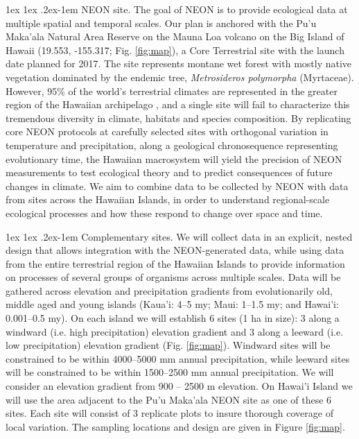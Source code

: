 \documentclass[11pt]{article}
\makeatletter
\renewcommand{\paragraph}{\@startsection{paragraph}{4}{\z@}
  {1ex \@plus 1ex \@minus .2ex}{-1em}
  {\normalfont\normalsize\it}
}
\makeatother
\begin{document}
\paragraph{NEON site.}
The goal of NEON is to provide ecological data at multiple spatial and
temporal scales. Our plan is anchored with the Pu'u Maka'ala Natural
Area Reserve on the Mauna Loa volcano on the Big Island of Hawaii
(19.553\textdegree, -155.317\textdegree; Fig. \ref{fig:map}), a Core
Terrestrial site with the launch date planned for 2017. The site
represents montane wet forest with mostly native vegetation dominated
by the endemic tree, {\it Metrosideros polymorpha}
(Myrtaceae). However, 95\% of the world’s terrestrial climates
are represented in the greater region of the Hawaiian archipelago
\citep{juvik1998}, and a single site will fail to characterize this
tremendous diversity in climate, habitats and species composition. By
replicating core NEON protocols at carefully selected sites with
orthogonal variation in temperature and precipitation, along a
geological chronosequence representing evolutionary time, the Hawaiian
macrosystem will yield the precision of NEON measurements to test
ecological theory and to predict consequences of future changes in
climate. We aim to combine data to be collected by NEON with data from sites
across the Hawaiian Islands, in order to understand regional-scale
ecological processes and how these respond to change over space and
time.


\paragraph{Complementary sites.}
We will collect data in an explicit, nested design that allows
integration with the NEON-generated data, while using data from the
entire terrestrial region of the Hawaiian Islands to provide
information on processes of several groups of organisms across
multiple scales. Data will be gathered across elevation and
precipitation gradients from evolutionarily old, middle aged and young
islands (Kaua'i: 4--5 my; Maui: 1--1.5 my; and Hawai'i: 0.001--0.5
my).  On each island we will establish 6 sites (1 ha in size): 3 along
a windward (i.e. high precipitation) elevation gradient and 3 along a
leeward (i.e. low precipitation) elevation gradient
(Fig. \ref{fig:map}).  Windward sites will be constrained to be within
4000--5000 mm annual precipitation, while leeward sites will be
constrained to be within 1500--2500 mm annual precipitation.  We will
consider an elevation gradient from 900 -- 2500 m elevation.  On
Hawai'i Island we will use the area adjacent to the Pu'u Maka'ala NEON
site as one of these 6 sites.  Each site will consist of 3 replicate
plots to insure thorough coverage of local variation. The sampling
locations and design are given in Figure \ref{fig:map}.
\end{document}

